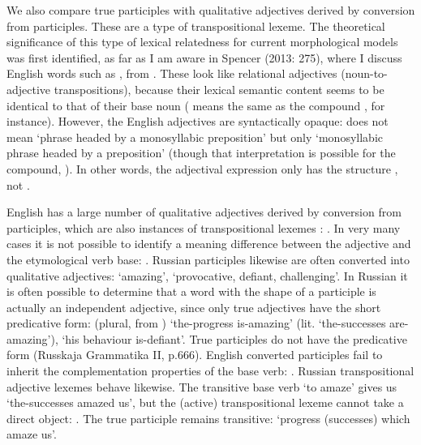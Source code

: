 \documentclass[output=paper,
modfonts
]{LSP/langsci}
\begin{document}
We  also compare true participles with qualitative adjectives derived by conversion from participles. These are a type of transpositional lexeme. The theoretical significance of this type of lexical relatedness for current morphological models was first identified, as far as I am aware in Spencer (2013: 275), where I discuss English words such as , from . These look like relational adjectives (noun-to-adjective transpositions), because their lexical semantic content seems to be identical to that of their base noun ( means the same as the compound , for instance). However,  the English adjectives are syntactically opaque:  does not mean ‘phrase headed by a monosyllabic preposition’ but only ‘monosyllabic phrase headed by a preposition’ (though that interpretation is possible for the compound,  ). In other words, the adjectival expression only has the structure , not .


English has a large number of qualitative adjectives derived by conversion from participles, which are also instances of transpositional lexemes \parencite{Spencer16:MorphMetatheory}:  . In very many cases it is not possible to identify a meaning difference between the adjective and the etymological verb base: . Russian participles likewise are often converted into qualitative adjectives:  ‘amazing’,  ‘provocative, defiant, challenging’. In Russian it is often possible to determine that a word with the shape of a participle is actually an independent adjective, since only true adjectives have the short predicative form:  (plural, from ) ‘the-progress is-amazing’ (lit. ‘the-successes are-amazing’),  ‘his behaviour is-defiant’. True participles do not have the predicative form (Russkaja Grammatika II, p.666). English converted participles fail to inherit the complementation properties of the base verb: . Russian transpositional adjective lexemes behave likewise. The transitive base verb  ‘to amaze’ gives us  ‘the-successes amazed us’, but the (active) transpositional lexeme cannot take a direct object: . The true participle remains transitive:  ‘progress (successes) which amaze us’.
\end{document}
